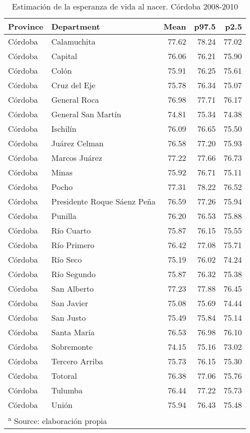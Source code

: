 \documentclass[12pt,]{article}
\begin{document}
\begin{table}

\caption{\label{tab:table_e0}Estimación de la esperanza de vida al nacer. Córdoba 2008-2010}
\centering
\begin{tabular}[t]{l|l|r|r|r}
\hline
Province & Department & Mean & p97.5 & p2.5\\
\hline
Córdoba & Calamuchita & 77.62 & 78.24 & 77.02\\
\hline
Córdoba & Capital & 76.06 & 76.21 & 75.90\\
\hline
Córdoba & Colón & 75.91 & 76.25 & 75.61\\
\hline
Córdoba & Cruz del Eje & 75.78 & 76.34 & 75.07\\
\hline
Córdoba & General Roca & 76.98 & 77.71 & 76.17\\
\hline
Córdoba & General San Martín & 74.81 & 75.34 & 74.38\\
\hline
Córdoba & Ischilín & 76.09 & 76.65 & 75.50\\
\hline
Córdoba & Juárez Celman & 76.58 & 77.20 & 75.93\\
\hline
Córdoba & Marcos Juárez & 77.22 & 77.66 & 76.73\\
\hline
Córdoba & Minas & 75.92 & 76.71 & 75.11\\
\hline
Córdoba & Pocho & 77.31 & 78.22 & 76.52\\
\hline
Córdoba & Presidente Roque Sáenz Peña & 76.59 & 77.26 & 75.94\\
\hline
Córdoba & Punilla & 76.20 & 76.53 & 75.88\\
\hline
Córdoba & Río Cuarto & 75.87 & 76.15 & 75.55\\
\hline
Córdoba & Río Primero & 76.42 & 77.08 & 75.71\\
\hline
Córdoba & Río Seco & 75.19 & 76.02 & 74.24\\
\hline
Córdoba & Río Segundo & 75.87 & 76.32 & 75.38\\
\hline
Córdoba & San Alberto & 77.23 & 77.88 & 76.45\\
\hline
Córdoba & San Javier & 75.08 & 75.69 & 74.44\\
\hline
Córdoba & San Justo & 75.49 & 75.84 & 75.14\\
\hline
Córdoba & Santa María & 76.53 & 76.98 & 76.10\\
\hline
Córdoba & Sobremonte & 74.15 & 75.16 & 73.02\\
\hline
Córdoba & Tercero Arriba & 75.73 & 76.15 & 75.30\\
\hline
Córdoba & Totoral & 76.38 & 77.06 & 75.76\\
\hline
Córdoba & Tulumba & 76.44 & 77.22 & 75.73\\
\hline
Córdoba & Unión & 75.94 & 76.43 & 75.48\\
\hline
\multicolumn{5}{l}{\textsuperscript{a} Source: elaboración propia}\\
\end{tabular}
\end{table}
\end{document}
